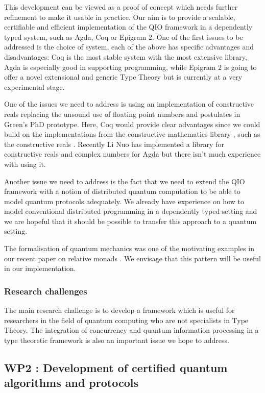 \documentclass[a4paper]{article}
\begin{document}
This development can be viewed as a proof of concept which needs
further refinement to make it usable in practice. Our aim is to
provide a scalable, certifiable and efficient implementation of the QIO
framework in a dependently typed system, such as Agda, Coq or Epigram
2.  One of the first issues to be addressed is the choice of system,
each of the above has specific advantages and disadvantages: Coq is
the most stable system with the most extensive library, Agda is
especially good in supporting programming, while Epigram 2 is going to
offer a novel extensional and generic Type Theory but is currently at
a very experimental stage.

One of the issues we need to address is using an implementation of
constructive reals replacing the unsound use of floating point numbers
and postulates in Green's PhD prototype. Here, Coq would provide clear
advantages since we could build on the implementations from the
constructive mathematics library , such as the constructive
reals . 
Recently Li Nuo has implemented a
library for constructive reals and complex numbers for Agda
but there isn't much experience with using it.

Another issue we need to address is the fact that we need to extend
the QIO framework with a notion of distributed quantum computation to be
able to model quantum protocols adequately. We already have experience
on how to model conventional distributed programming in a dependently
typed setting  and we are hopeful that it should be possible to
transfer this approach to a quantum setting.

The formalisation of quantum mechanics was one of the motivating
examples in our recent paper on relative monads .
We envisage that this pattern will be useful in our implementation.

\subsubsection*{Research challenges}
\label{sec:rsearch-challenges}

The main research challenge is to develop a framework which is useful for
researchers in the field of quantum computing who are not specialists
in Type Theory. The integration of concurrency and quantum information
processing in a type theoretic framework is also an important issue 
we hope to address.

\subsection*{WP2 : Development of certified quantum algorithms and protocols }
\label{sec:wp2}
\end{document}
